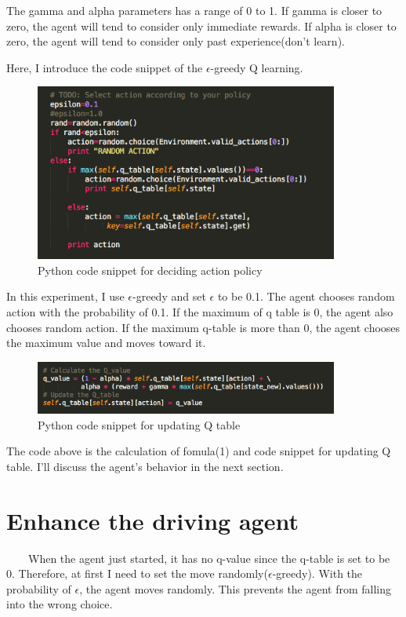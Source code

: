 \documentclass[a4paper,11pt]{article}
\begin{document}
The gamma and alpha parameters has a range of 0 to 1. If gamma is closer to zero, the agent will tend to consider only immediate rewards. If alpha is closer to zero, the agent will tend to consider only past experience(don't learn).

Here, I introduce the code snippet of the $\epsilon$-greedy Q learning.
\begin{figure}[H]
\begin{center}
\includegraphics[width=100mm]{graph/python_code.jpg}
\end{center}
\caption{Python code snippet for deciding action policy}
\label{fig:1}
\end{figure}

In this experiment, I use $\epsilon$-greedy  and set $\epsilon$ to be 0.1. The agent chooses random action with the probability of 0.1. If the maximum of q table is 0, the agent also chooses random action. If the maximum q-table is more than 0, the agent chooses the maximum value and moves toward it.


\begin{figure}[H]
\begin{center}
\includegraphics[width=100mm]{graph/python_code2.jpg}
\end{center}
\caption{Python code snippet for updating Q table}
\label{fig:2}
\end{figure}
The code above is the calculation of fomula(1) and code snippet for updating Q table.
I'll discuss the agent's behavior in the next section.








\section{Enhance the driving agent}
\ \ \ \ When the agent just started, it has no q-value since the q-table is set to be 0. Therefore, at first I need to set the move randomly($\epsilon$-greedy).
With the probability of $\epsilon$, the agent moves randomly. This prevents the agent from falling into the wrong choice. 
\\
\end{document}
